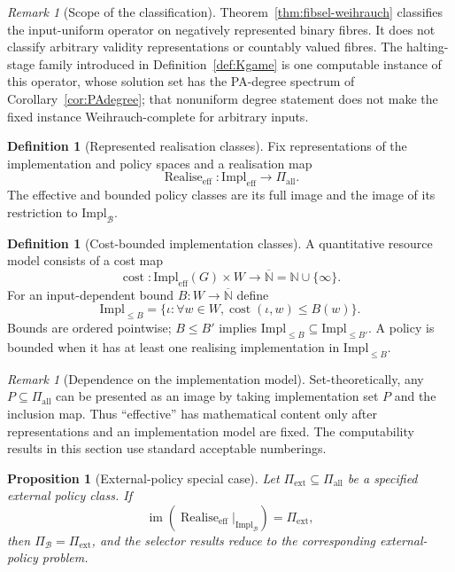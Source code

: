 \documentclass[11pt]{article}
\theoremstyle{plain}
\newtheorem{proposition}[theorem]{Proposition}
\theoremstyle{definition}
\newtheorem{definition}[theorem]{Definition}
\theoremstyle{remark}
\newtheorem{remark}[theorem]{Remark}
\newcommand{\N}{\mathbb{N}}
\newcommand{\im}{\operatorname{im}}
\newcommand{\realise}{\operatorname{Realise}}
\begin{document}
\begin{remark}[Scope of the classification]
Theorem~\ref{thm:fibsel-weihrauch} classifies the input-uniform operator on
negatively represented binary fibres. It does not classify arbitrary validity
representations or countably valued fibres. The halting-stage family introduced in
Definition~\ref{def:Kgame} is one computable instance of this operator, whose
solution set has the PA-degree spectrum of Corollary~\ref{cor:PAdegree}; that
nonuniform degree statement does not make the fixed instance Weihrauch-complete
for arbitrary inputs.
\end{remark}

\begin{definition}[Represented realisation classes]\label{def:represented-realisation}
Fix representations of the implementation and policy spaces and a realisation
map
\[
\realise_{\mathrm{eff}}:\mathrm{Impl}_{\mathrm{eff}}
\to\Pi_{\mathrm{all}}.
\]
The effective and bounded policy classes are its full image and the image of its
restriction to $\mathrm{Impl}_{\mathcal B}$.
\end{definition}

\begin{definition}[Cost-bounded implementation classes]\label{def:cost}
A quantitative resource model consists of a cost map
\[
\operatorname{cost}:\mathrm{Impl}_{\mathrm{eff}}(G)\times W
\to\overline{\N}=\N\cup\{\infty\}.
\]
For an input-dependent bound $B:W\to\overline{\N}$ define
\[
\mathrm{Impl}_{\le B}
=\{\iota:\forall w\in W,
\operatorname{cost}(\iota,w)\le B(w)\}.
\]
Bounds are ordered pointwise; $B\le B'$ implies
$\mathrm{Impl}_{\le B}\subseteq\mathrm{Impl}_{\le B'}$. A policy is bounded
when it has at least one realising implementation in $\mathrm{Impl}_{\le B}$.
\end{definition}

\begin{remark}[Dependence on the implementation model]\label{rem:abstractimage}
Set-theoretically, any $P\subseteq\Pi_{\mathrm{all}}$ can be presented as an
image by taking implementation set $P$ and the inclusion map. Thus ``effective''
has mathematical content only after representations and an implementation model
are fixed. The computability results in this section use standard acceptable numberings.
\end{remark}

\begin{proposition}[External-policy special case]\label{prop:nonembedded}
Let $\Pi_{\mathrm{ext}}\subseteq\Pi_{\mathrm{all}}$ be a specified external
policy class. If
\[
\im\!\left(
\realise_{\mathrm{eff}}|_{\mathrm{Impl}_{\mathcal B}}
\right)=\Pi_{\mathrm{ext}},
\]
then $\Pi_{\mathcal B}=\Pi_{\mathrm{ext}}$, and the selector results reduce to
the corresponding external-policy problem.
\end{proposition}
\end{document}
